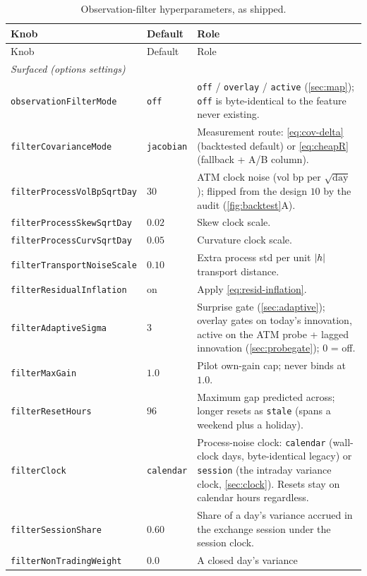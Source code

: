 \documentclass[11pt]{article}
\begin{document}
\begingroup
\small
\begin{longtable}{p{}p{}p{}}
\caption{Observation-filter hyperparameters, as shipped.}\label{tab:atlas}\\
\toprule Knob & Default & Role\\ \midrule
\endfirsthead \toprule Knob & Default & Role\\ \midrule \endhead
\multicolumn{3}{l}{\emph{Surfaced (options settings)}}\\ \midrule
\texttt{observationFilterMode} & \texttt{off} & \texttt{off} /
\texttt{overlay} / \texttt{active} (\cref{sec:map}); \texttt{off} is
byte-identical to the feature never existing.\\
\texttt{filterCovarianceMode} & \texttt{jacobian} & Measurement route:
\cref{eq:cov-delta} (backtested default) or \cref{eq:cheapR} (fallback
+ A/B column).\\
\texttt{filterProcessVolBpSqrtDay} & $30$ & ATM clock noise (vol bp per
$\sqrt{\text{day}}$); flipped from the design $10$ by the audit
(\cref{fig:backtest}A).\\
\texttt{filterProcessSkewSqrtDay} & $0.02$ & Skew clock scale.\\
\texttt{filterProcessCurvSqrtDay} & $0.05$ & Curvature clock scale.\\
\texttt{filterTransportNoiseScale} & $0.10$ & Extra process std per unit
$\lvert h\rvert$ transport distance.\\
\texttt{filterResidualInflation} & on & Apply
\cref{eq:resid-inflation}.\\
\texttt{filterAdaptiveSigma} & $3$ & Surprise gate
(\cref{sec:adaptive}); overlay gates on today's innovation, active on
the ATM probe + lagged innovation (\cref{sec:probegate}); $0$ = off.\\
\texttt{filterMaxGain} & $1.0$ & Pilot own-gain cap; never binds at
$1.0$.\\
\texttt{filterResetHours} & $96$ & Maximum gap predicted across; longer
resets as \texttt{stale} (spans a weekend plus a holiday).\\
\texttt{filterClock} & \texttt{calendar} & Process-noise clock:
\texttt{calendar} (wall-clock days, byte-identical legacy) or
\texttt{session} (the intraday variance clock, \cref{sec:clock}).
Resets stay on calendar hours regardless.\\
\texttt{filterSessionShare} & $0.60$ & Share of a day's variance
accrued in the exchange session under the session clock.\\
\texttt{filterNonTradingWeight} & $0.0$ & A closed day's variance

\end{longtable}
\end{document}
